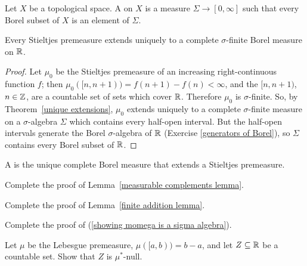 \begin{definition}
Let $X$ be a topological space.
A  on $X$ is a measure $\Sigma \to [0, \infty]$ such that every Borel subset of $X$ is an element of $\Sigma$.
\end{definition}

\begin{theorem}
Every Stieltjes premeasure extends uniquely to a complete $\sigma$-finite Borel measure on $\mathbb{R}$.
\end{theorem}
\begin{proof}
Let $\mu_{0}$ be the Stieltjes premeasure of an increasing right-continuous function $f$; then $\mu_{0}([n, n + 1)) = f(n + 1) - f(n) < \infty$, and the $[n, n + 1)$, $n \in \mathbb{Z}$, are a countable set of sets which cover $\mathbb{R}$.
Therefore $\mu_{0}$ is $\sigma$-finite.
So, by Theorem~\ref{unique extensions}, $\mu_{0}$ extends uniquely to a complete $\sigma$-finite measure on a $\sigma$-algebra $\Sigma$ which contains every half-open interval.
But the half-open intervals generate the Borel $\sigma$-algebra of $\mathbb{R}$ (Exercise \ref{generators of Borel}), so $\Sigma$ contains every Borel subset of $\mathbb{R}$.
\end{proof}

\begin{definition}
A  is the unique complete Borel measure that extends a Stieltjes premeasure.
\end{definition}

\begin{exercise}\label{measurable complements}
Complete the proof of Lemma~\ref{measurable complements lemma}.
\end{exercise}

\begin{exercise}\label{finite addition exercise}
Complete the proof of Lemma~\ref{finite addition lemma}.
\end{exercise}

\begin{exercise}\label{showing momega is a sigma algebra exercise}
Complete the proof of (\ref{showing momega is a sigma algebra}).
\end{exercise}

\begin{exercise}
Let $\mu$ be the Lebesgue premeasure, $\mu([a, b)) = b - a$, and let $Z \subseteq \mathbb{R}$ be a countable set.
Show that $Z$ is $\mu^{*}$-null.
\end{exercise}


